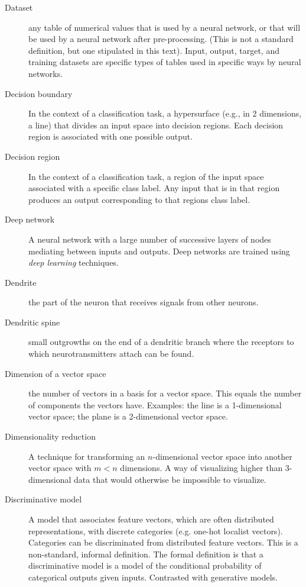 \begin{description}
\item[Dataset] any table of numerical values that is used by a neural network, or that will be used by a neural network after pre-processing. (This is not a standard definition, but one stipulated in this text). Input, output, target, and training datasets are specific types of tables used in specific ways by neural networks.

\item[Decision boundary] In the context of a classification task, a hypersurface (e.g., in 2 dimensions, a line) that divides an input space into decision regions. Each decision region is associated with one possible output.

\item[Decision region] In the context of a classification task, a region of the input space associated with a specific class label. Any input that is in that region produces an output corresponding to that regions class label.

\item[Deep network] A neural network with a large number of successive layers of nodes mediating between inputs and outputs. Deep networks are trained using \emph{deep learning} techniques.

\item[Dendrite] the part of the neuron that receives signals from other neurons.

\item[Dendritic spine] small outgrowths on the end of a dendritic branch where the receptors to which neurotransmitters attach can be found.

\item[Dimension of a vector space] the number of vectors in a basis for a vector space. This equals the number of components the vectors have. Examples: the line is a 1-dimensional vector space; the plane is a 2-dimensional vector space.

\item[Dimensionality reduction] A technique for transforming an $n$-dimensional vector space into another vector space with $m<n$ dimensions. A way of visualizing higher than 3-dimensional data that would otherwise be impossible to visualize.

\item[Discriminative model] A model that associates feature vectors, which are often distributed representations, with discrete categories (e.g. one-hot localist vectors).  Categories can be discriminated from distributed feature vectors. This is a non-standard, informal definition. The formal definition is that a discriminative model is a model of the conditional probability of categorical outputs given inputs. Contrasted with generative models.


\end{description}
